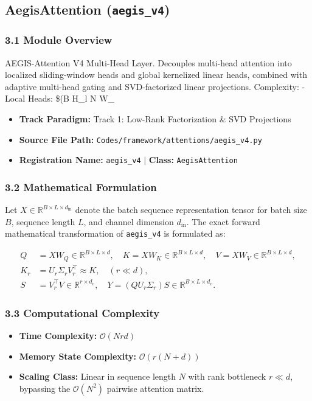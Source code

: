 \subsection{AegisAttention (\texttt{aegis\_v4})}
\label{sec:app_module_aegis_v4}

\subsubsection*{3.1 Module Overview}
AEGIS-Attention V4 Multi-Head Layer.  Decouples multi-head attention into localized sliding-window heads and global kernelized linear heads, combined with adaptive multi-head gating and SVD-factorized linear projections.  Complexity:     - Local Heads: \$(B \cdot H\_l \cdot N \cdot W\_{\text
\begin{itemize}
    \item \textbf{Track Paradigm:} Track 1: Low-Rank Factorization & SVD Projections
    \item \textbf{Source File Path:} \texttt{Codes/framework/attentions/aegis\_v4.py}
    \item \textbf{Registration Name:} \texttt{aegis\_v4} $\mid$ \textbf{Class:} \texttt{AegisAttention}
\end{itemize}

\subsubsection*{3.2 Mathematical Formulation}
Let $X \in \mathbb{R}^{B \times L \times d_{\text{in}}}$ denote the batch sequence representation tensor for batch size $B$, sequence length $L$, and channel dimension $d_{\text{in}}$. The exact forward mathematical transformation of \texttt{aegis\_v4} is formulated as:

\begin{align}
Q &= X W_Q \in \mathbb{R}^{B \times L \times d}, \quad K = X W_K \in \mathbb{R}^{B \times L \times d}, \quad V = X W_V \in \mathbb{R}^{B \times L \times d}, \\
K_r &= U_r \Sigma_r V_r^\top \approx K, \quad (r \ll d), \\
S &= V_r^\top V \in \mathbb{R}^{r \times d_v}, \quad Y = (Q U_r \Sigma_r) S \in \mathbb{R}^{B \times L \times d_v}.
\end{align}


\subsubsection*{3.3 Computational Complexity}
\begin{itemize}
    \item \textbf{Time Complexity:} $\mathcal{O}(N r d)$
    \item \textbf{Memory State Complexity:} $\mathcal{O}(r(N + d))$
    \item \textbf{Scaling Class:} Linear in sequence length $N$ with rank bottleneck $r \ll d$, bypassing the $\mathcal{O}(N^2)$ pairwise attention matrix.
\end{itemize}

}
